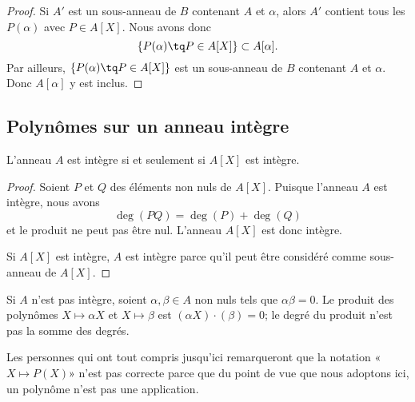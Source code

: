 \begin{proof}
	Si \( A'\) est un sous-anneau de \( B\) contenant \( A\) et \( \alpha\), alors \( A'\) contient tous les \( P(\alpha)\) avec \( P\in A[X]\). Nous avons donc
	\begin{equation}
		\{ P(\alpha)\tq P\in A[X] \}\subset A[\alpha].
	\end{equation}
	Par ailleurs, \( \{ P(\alpha)\tq P\in A[X] \}\) est un sous-anneau de \( B\) contenant \( A\) et \( \alpha\). Donc \( A[\alpha]\) y est inclus.
\end{proof}

\subsection{Polynômes sur un anneau intègre}

\begin{theorem}     \label{ThoBUEDrJ}
	L'anneau \( A\) est intègre si et seulement si \( A[X]\) est intègre.
\end{theorem}

\begin{proof}
	Soient \( P\) et \( Q\) des éléments non nuls de \( A[X]\). Puisque l'anneau \( A\) est intègre, nous avons
	\begin{equation}
		\deg(PQ)=\deg(P)+\deg(Q)
	\end{equation}
	et le produit ne peut pas être nul. L'anneau \( A[X]\) est donc intègre.

	Si \( A[X]\) est intègre, \( A\) est intègre parce qu'il peut être considéré comme sous-anneau de \( A[X]\).
\end{proof}

\begin{normaltext}
	Si \( A\) n'est pas intègre, soient \( \alpha,\beta\in A\) non nuls tels que \( \alpha\beta=0\). Le produit des polynômes \( X\mapsto \alpha X\) et \( X\mapsto \beta\) est \( (\alpha X)\cdot(\beta)=0\); le degré du produit n'est pas la somme des degrés.

	Les personnes qui ont tout compris jusqu'ici remarqueront que la notation «\( X\mapsto P(X)\)» n'est pas correcte parce que du point de vue que nous adoptons ici, un polynôme n'est pas une application.
\end{normaltext}

